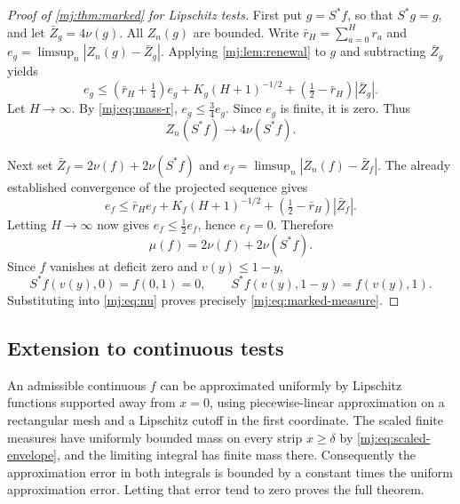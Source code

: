 \documentclass[11pt,a4paper]{article}
\theoremstyle{definition}\newaliascnt{definition}{theorem}
\theoremstyle{remark}\newaliascnt{remark}{theorem}
\begin{document}
\begin{proof}[Proof of \cref{mj:thm:marked} for Lipschitz tests]
First put $g=S^\ast f$, so that $S^\ast g=g$, and let
$\bar Z_g=4\nu(g)$. All $Z_n(g)$ are bounded. Write
$\bar r_H=\sum_{a=0}^H r_a$ and $e_g=\limsup_n|Z_n(g)-\bar Z_g|$.
Applying \cref{mj:lem:renewal} to $g$ and subtracting $\bar Z_g$ yields
\[
 e_g\le(\bar r_H+\tfrac14)e_g
       +K_g(H+1)^{-1/2}
       +(\tfrac12-\bar r_H)|\bar Z_g|.
\]
Let $H\to\infty$. By \eqref{mj:eq:mass-r}, $e_g\le\frac34e_g$. Since $e_g$
is finite, it is zero. Thus
\begin{equation}
 Z_n(S^\ast f)\longrightarrow4\nu(S^\ast f).
 \label{mj:eq:projected-limit}
\end{equation}

Next set $\bar Z_f=2\nu(f)+2\nu(S^\ast f)$ and
$e_f=\limsup_n|Z_n(f)-\bar Z_f|$. The already established convergence of the
projected sequence gives
\[
 e_f\le\bar r_He_f+K_f(H+1)^{-1/2}
             +(\tfrac12-\bar r_H)|\bar Z_f|.
\]
Letting $H\to\infty$ now gives $e_f\le\frac12e_f$, hence $e_f=0$. Therefore
\begin{equation}
 \mu(f)=2\nu(f)+2\nu(S^\ast f).
 \label{mj:eq:resolvent}
\end{equation}
Since $f$ vanishes at deficit zero and $v(y)\le1-y$,
\[
 S^\ast f(v(y),0)=f(0,1)=0,
 \qquad S^\ast f(v(y),1-y)=f(v(y),1).
\]
Substituting into \eqref{mj:eq:nu} proves precisely
\eqref{mj:eq:marked-measure}.
\end{proof}

\subsection{Extension to continuous tests}
An admissible continuous $f$ can be approximated uniformly by Lipschitz
functions supported away from $x=0$, using piecewise-linear approximation on
a rectangular mesh and a Lipschitz cutoff in the first coordinate. The scaled
finite measures have uniformly bounded mass on every strip $x\ge\delta$ by
\eqref{mj:eq:scaled-envelope}, and the limiting integral has finite mass
there. Consequently the approximation error in both integrals is bounded by a
constant times the uniform approximation error. Letting that error tend to
zero proves the full theorem.
\end{document}

